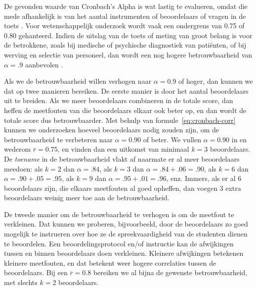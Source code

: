 \documentclass[
]{book}
\begin{document}
De gevonden waarde van Cronbach's Alpha is wat lastig te evalueren,
omdat die mede afhankelijk is van het aantal instrumenten of
beoordelaars of vragen in de toets \citep{Cort93, Glin01}. Voor
wetenschappelijk onderzoek wordt vaak een ondergrens van 0.75 of 0.80
gehanteerd. Indien de uitslag van de toets of meting van groot belang is
voor de betrokkene, zoals bij medische of psychische diagnostiek van
patiënten, of bij werving en selectie van personeel, dan wordt een nog
hogere betrouwbaarheid van \(\alpha=.9\) aanbevolen \citep{Glin01}.

Als we de betrouwbaarheid willen verhogen naar \(\alpha=0.9\) of hoger,
dan kunnen we dat op twee manieren bereiken. De eerste manier is door
het aantal beoordelaars uit te breiden. Als we meer beoordelaars
combineren in de totale score, dan heffen de meetfouten van die
beoordelaars elkaar ook beter op, en dan wordt de totale score dus
betrouwbaarder. Met behulp van
formule~\eqref{eq:cronbach-corr} kunnen we onderzoeken hoeveel beoordelaars
nodig zouden zijn, om de betrouwbaarheid te verbeteren naar
\(\alpha=0.90\) of beter. We vullen \(\alpha=0.90\) in en wederom
\(\overline{r}=0.75\), en vinden dan een uitkomst van minimaal \(k=3\)
beoordelaars. De \emph{toename} in de betrouwbaarheid vlakt af naarmate er al
meer beoordelaars meedoen: als \(k=2\) dan \(\alpha=.84\), als \(k=3\) dan
\(\alpha=.84+.06=.90\), als \(k=6\) dan \(\alpha=.90+.05=.95\), als \(k=9\) dan
\(\alpha=.95+.01=.96\), enz. Immers, als er al 6 beoordelaars zijn, die
elkaars meetfouten al goed opheffen, dan voegen 3 extra beoordelaars
weinig meer toe aan de betrouwbaarheid.

De tweede manier om de betrouwbaarheid te verhogen is om de meetfout te
verkleinen. Dat kunnen we proberen, bijvoorbeeld, door de beoordelaars
zo goed mogelijk te instrueren over hoe ze de spreekvaardigheid van de
studenten dienen te beoordelen. Een beoordelingsprotocol en/of
instructie kan de afwijkingen tussen en binnen beoordelaars doen
verkleinen. Kleinere afwijkingen betekenen kleinere meetfouten, en dat
betekent weer hogere correlaties tussen de beoordelaars. Bij een
\(\overline{r}=0.8\) bereiken we al bijna de gewenste betrouwbaarheid, met
slechts \(k=2\) beoordelaars.
\end{document}
